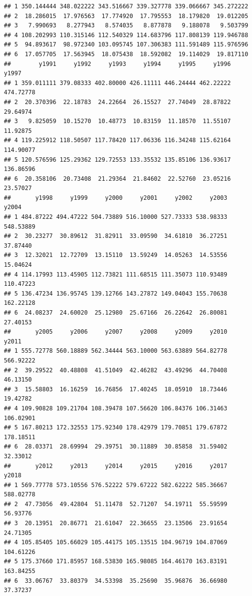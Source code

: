 \documentclass[]{book}
\begin{document}
\begin{verbatim}
## 1 350.144444 348.022222 343.516667 339.327778 339.066667 345.272222
## 2  18.286015  17.976563  17.774920  17.795553  18.179820  19.012205
## 3   7.990693   8.277943   8.574035   8.877878   9.188078   9.503799
## 4 108.202993 110.315146 112.540329 114.683796 117.808139 119.946788
## 5  94.893617  98.972340 103.095745 107.306383 111.591489 115.976596
## 6  17.057705  17.563945  18.075438  18.592082  19.114029  19.817110
##        y1991     y1992     y1993     y1994     y1995     y1996     y1997
## 1 359.011111 379.08333 402.80000 426.11111 446.24444 462.22222 474.72778
## 2  20.370396  22.18783  24.22664  26.15527  27.74049  28.87822  29.64974
## 3   9.825059  10.15270  10.48773  10.83159  11.18570  11.55107  11.92875
## 4 119.225912 118.50507 117.78420 117.06336 116.34248 115.62164 114.90077
## 5 120.576596 125.29362 129.72553 133.35532 135.85106 136.93617 136.86596
## 6  20.358106  20.73408  21.29364  21.84602  22.52760  23.05216  23.57027
##       y1998     y1999     y2000     y2001     y2002     y2003     y2004
## 1 484.87222 494.47222 504.73889 516.10000 527.73333 538.98333 548.53889
## 2  30.23277  30.89612  31.82911  33.09590  34.61810  36.27251  37.87440
## 3  12.32021  12.72709  13.15110  13.59249  14.05263  14.53556  15.04624
## 4 114.17993 113.45905 112.73821 111.68515 111.35073 110.93489 110.47223
## 5 136.47234 136.95745 139.12766 143.27872 149.04043 155.70638 162.22128
## 6  24.08237  24.60020  25.12980  25.67166  26.22642  26.80081  27.40153
##       y2005     y2006     y2007     y2008     y2009     y2010     y2011
## 1 555.72778 560.18889 562.34444 563.10000 563.63889 564.82778 566.92222
## 2  39.29522  40.48808  41.51049  42.46282  43.49296  44.70408  46.13150
## 3  15.58803  16.16259  16.76856  17.40245  18.05910  18.73446  19.42782
## 4 109.90828 109.21704 108.39478 107.56620 106.84376 106.31463 106.02901
## 5 167.80213 172.32553 175.92340 178.42979 179.70851 179.67872 178.18511
## 6  28.03371  28.69994  29.39751  30.11889  30.85858  31.59402  32.33012
##       y2012     y2013     y2014     y2015     y2016     y2017     y2018
## 1 569.77778 573.10556 576.52222 579.67222 582.62222 585.36667 588.02778
## 2  47.73056  49.42804  51.11478  52.71207  54.19711  55.59599  56.93776
## 3  20.13951  20.86771  21.61047  22.36655  23.13506  23.91654  24.71305
## 4 105.85405 105.66029 105.44175 105.13515 104.96719 104.87069 104.61226
## 5 175.37660 171.85957 168.53830 165.98085 164.46170 163.83191 163.84255
## 6  33.06767  33.80379  34.53398  35.25690  35.96876  36.66980  37.37237
\end{verbatim}
\end{document}
